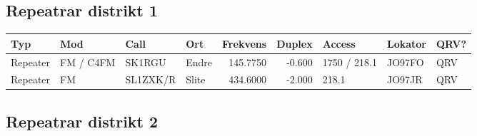 \begin{landscape}
\clearpage

\subsection{Repeatrar distrikt 1}


\begin{longtable}{llllrrlll}
\bf Typ  & \bf Mod     & \bf Call & \bf Ort     & \bf Frekvens & \bf Duplex & \bf Access & \bf Lokator & \bf QRV? \\ \hline
Repeater   & FM / C4FM & SK1RGU   & Endre        & 145.7750     & -0.600     & 1750 / 218.1 & JO97FO      & QRV      \\
Repeater   & FM        & SL1ZXK/R & Slite        & 434.6000     & -2.000     & 218.1        & JO97JR      & QRV      \\
\end{longtable}



\subsection{Repeatrar distrikt 2}




\end{landscape}
